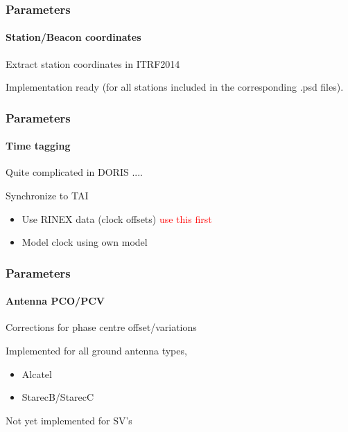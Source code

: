\documentclass{beamer}
\begin{document}
\begin{frame}\frametitle{Parameters}\framesubtitle{Station/Beacon coordinates}
    Extract station coordinates in ITRF2014\\
    \vspace{.3cm}

    Implementation ready (for all stations included in the corresponding .psd files).\\
    \vspace{.3cm}

\end{frame}

\begin{frame}\frametitle{Parameters}\framesubtitle{Time tagging}
    Quite complicated in DORIS ....
    \vspace{.3cm}

    Synchronize to TAI\\
    \vspace{.3cm}

  \begin{itemize}
      \item Use RINEX data (clock offsets) \textcolor{red}{use this first}
      \item Model clock using own model
  \end{itemize}
    \vspace{.3cm}

\end{frame}

\begin{frame}\frametitle{Parameters}\framesubtitle{Antenna PCO/PCV}
    Corrections for phase centre offset/variations\\
    \vspace{.3cm}

  Implemented for all ground antenna types,
  \begin{itemize}
      \item Alcatel
      \item StarecB/StarecC
  \end{itemize}
  \vspace{.3cm}

  Not yet implemented for SV's
  \vspace{.3cm}

\end{frame}


\end{document}
